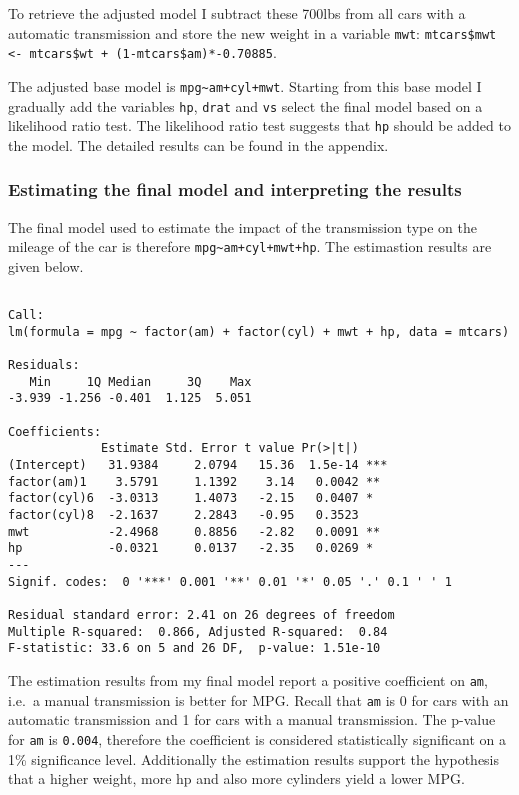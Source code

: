 \documentclass[5pt,]{article}
\begin{document}
To retrieve the adjusted model I subtract these 700lbs from all cars
with a automatic transmission and store the new weight in a variable
\texttt{mwt}:
\texttt{mtcars\$mwt \textless{}- mtcars\$wt + (1-mtcars\$am)*-0.70885}.

The adjusted base model is \texttt{mpg\textasciitilde{}am+cyl+mwt}.
Starting from this base model I gradually add the variables \texttt{hp},
\texttt{drat} and \texttt{vs} select the final model based on a
likelihood ratio test. The likelihood ratio test suggests that
\texttt{hp} should be added to the model. The detailed results can be
found in the appendix.

\subsubsection{Estimating the final model and interpreting the
results}\label{estimating-the-final-model-and-interpreting-the-results}

The final model used to estimate the impact of the transmission type on
the mileage of the car is therefore
\texttt{mpg\textasciitilde{}am+cyl+mwt+hp}. The estimastion results are
given below.

\begin{verbatim}

Call:
lm(formula = mpg ~ factor(am) + factor(cyl) + mwt + hp, data = mtcars)

Residuals:
   Min     1Q Median     3Q    Max 
-3.939 -1.256 -0.401  1.125  5.051 

Coefficients:
             Estimate Std. Error t value Pr(>|t|)    
(Intercept)   31.9384     2.0794   15.36  1.5e-14 ***
factor(am)1    3.5791     1.1392    3.14   0.0042 ** 
factor(cyl)6  -3.0313     1.4073   -2.15   0.0407 *  
factor(cyl)8  -2.1637     2.2843   -0.95   0.3523    
mwt           -2.4968     0.8856   -2.82   0.0091 ** 
hp            -0.0321     0.0137   -2.35   0.0269 *  
---
Signif. codes:  0 '***' 0.001 '**' 0.01 '*' 0.05 '.' 0.1 ' ' 1

Residual standard error: 2.41 on 26 degrees of freedom
Multiple R-squared:  0.866, Adjusted R-squared:  0.84 
F-statistic: 33.6 on 5 and 26 DF,  p-value: 1.51e-10
\end{verbatim}

The estimation results from my final model report a positive coefficient
on \texttt{am}, i.e.~a manual transmission is better for MPG. Recall
that \texttt{am} is 0 for cars with an automatic transmission and 1 for
cars with a manual transmission. The p-value for \texttt{am} is
\texttt{0.004}, therefore the coefficient is considered statistically
significant on a 1\% significance level. Additionally the estimation
results support the hypothesis that a higher weight, more hp and also
more cylinders yield a lower MPG.
\end{document}
